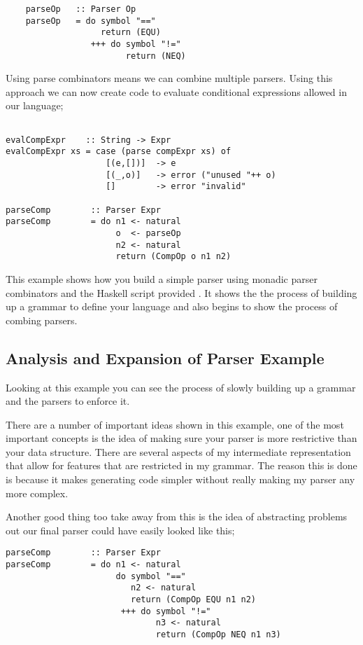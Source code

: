 \begin{lstlisting}
	parseOp   :: Parser Op
	parseOp   = do symbol "=="
	               return (EQU)
        	     +++ do symbol "!="
	                    return (NEQ) 
\end{lstlisting} 

Using parse combinators means we can combine multiple parsers. Using this approach we can now create code to evaluate conditional expressions allowed in our language;

\begin{lstlisting}

evalCompExpr    :: String -> Expr
evalCompExpr xs = case (parse compExpr xs) of
                    [(e,[])]  -> e
                    [(_,o)]   -> error ("unused "++ o)
                    []        -> error "invalid"

parseComp        :: Parser Expr	
parseComp        = do n1 <- natural
                      o  <- parseOp 
                      n2 <- natural
                      return (CompOp o n1 n2)  
\end{lstlisting}

This example shows how you build a simple parser using monadic parser combinators and the Haskell script provided %
. It shows the the process of building up a grammar to define your language and also begins to show the process of combing parsers. 


\subsection{Analysis and Expansion of Parser Example}

Looking at this example you can see the process of slowly building up a grammar and the parsers to enforce it.

There are a number of important ideas shown in this example, one of the most important concepts is the idea of making sure your parser is more restrictive than your data structure. There are several aspects of my intermediate representation that allow for features that are restricted in my grammar. The reason this is done is because it makes generating code simpler without really making my parser any more complex.  

Another good thing too take away from this is the idea of abstracting problems out our final parser could have easily looked like this;

\begin{lstlisting}
parseComp        :: Parser Expr	
parseComp        = do n1 <- natural
                      do symbol "==" 
                         n2 <- natural
                         return (CompOp EQU n1 n2)
                       +++ do symbol "!="
                              n3 <- natural
                              return (CompOp NEQ n1 n3)
\end{lstlisting}

